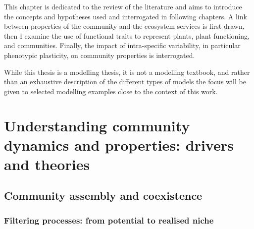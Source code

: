 \begin{fullwidth}
This chapter is dedicated to the review of the literature and aims to introduce the concepts and hypotheses used and interrogated in following chapters. A link between properties of the community and the ecosystem services is first drawn, then I examine the use of functional traits to represent plants, plant functioning, and communities. Finally, the impact of intra-specific variability, in particular phenotypic plasticity, on community properties is interrogated.

While this thesis is a modelling thesis, it is not a modelling textbook, and rather than an exhaustive description of the different types of models the focus will be given to selected modelling examples close to the context of this work.
\end{fullwidth}

\chapter{Understanding community dynamics and properties: drivers and theories}\label{chapter:coexistence}





\section{Community assembly and coexistence}



\subsection{Filtering processes: from potential to realised niche}


